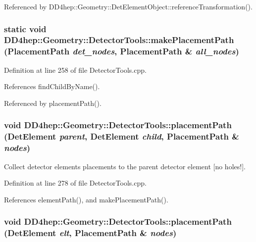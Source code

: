 Referenced by DD4hep::Geometry::DetElementObject::referenceTransformation().\hypertarget{namespace_d_d4hep_1_1_geometry_1_1_detector_tools_adc948b938f4fbbdc46ad6f47f35059a0}{
\subsubsection[{makePlacementPath}]{\setlength{\rightskip}{0pt plus 5cm}static void DD4hep::Geometry::DetectorTools::makePlacementPath ({\bf PlacementPath} {\em det\_\-nodes}, \/  {\bf PlacementPath} \& {\em all\_\-nodes})}}
\label{namespace_d_d4hep_1_1_geometry_1_1_detector_tools_adc948b938f4fbbdc46ad6f47f35059a0}


Definition at line 258 of file DetectorTools.cpp.

References findChildByName().

Referenced by placementPath().\hypertarget{namespace_d_d4hep_1_1_geometry_1_1_detector_tools_ae4ebaffda73014e393cf33ea3bfe0870}{
\subsubsection[{placementPath}]{\setlength{\rightskip}{0pt plus 5cm}void DD4hep::Geometry::DetectorTools::placementPath ({\bf DetElement} {\em parent}, \/  {\bf DetElement} {\em child}, \/  {\bf PlacementPath} \& {\em nodes})}}
\label{namespace_d_d4hep_1_1_geometry_1_1_detector_tools_ae4ebaffda73014e393cf33ea3bfe0870}


Collect detector elements placements to the parent detector element \mbox{[}no holes!\mbox{]}. 

Definition at line 278 of file DetectorTools.cpp.

References elementPath(), and makePlacementPath().\hypertarget{namespace_d_d4hep_1_1_geometry_1_1_detector_tools_a4643e9605448f9652b2c95e6ef5619c3}{
\subsubsection[{placementPath}]{\setlength{\rightskip}{0pt plus 5cm}void DD4hep::Geometry::DetectorTools::placementPath ({\bf DetElement} {\em elt}, \/  {\bf PlacementPath} \& {\em nodes})}}
\label{namespace_d_d4hep_1_1_geometry_1_1_detector_tools_a4643e9605448f9652b2c95e6ef5619c3}


